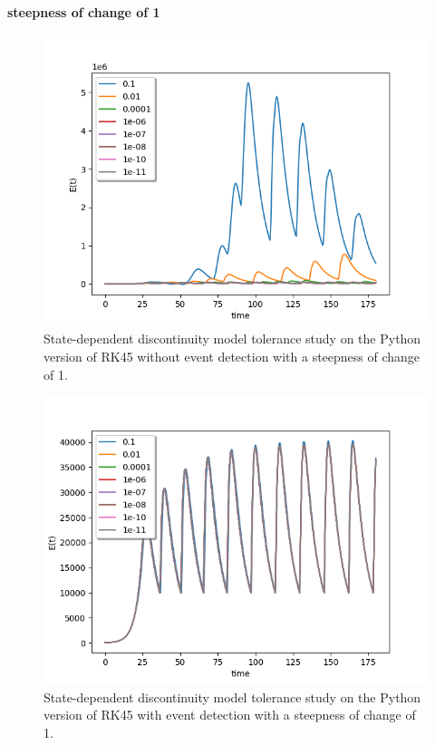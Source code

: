 \paragraph{steepness of change of 1}
\begin{figure}[H]
\centering
\includegraphics[width=0.7\linewidth]{./figures/exp_state_tol_rk45_no_event_1}
\caption{State-dependent discontinuity model tolerance study on the Python version of RK45 without event detection with a steepness of change of 1.}
\label{fig:exp_state_tol_rk45_no_event_1}
\end{figure}

\begin{figure}[H]
\centering
\includegraphics[width=0.7\linewidth]{./figures/exp_state_tol_rk45_event_1}
\caption{State-dependent discontinuity model tolerance study on the Python version of RK45 with event detection with a steepness of change of 1.}
\label{fig:exp_state_tol_rk45_event_1}
\end{figure}


